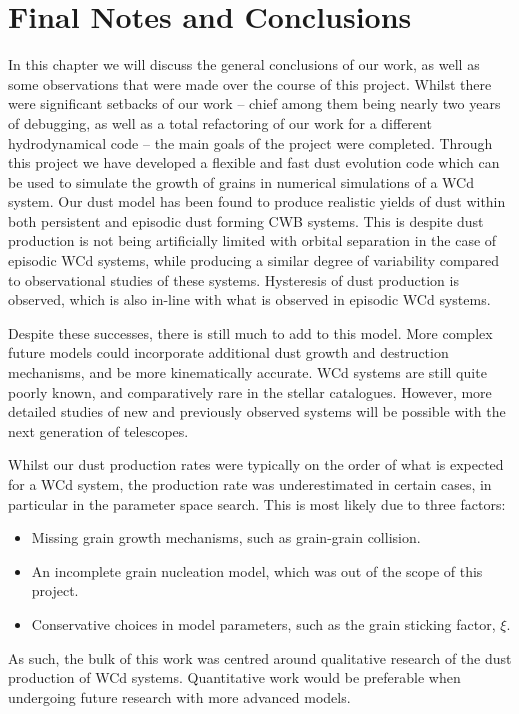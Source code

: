 \chapter{Final Notes and Conclusions}

In this chapter we will discuss the general conclusions of our work, as well as some observations that were made over the course of this project.
Whilst there were significant setbacks of our work -- chief among them being nearly two years of debugging, as well as a total refactoring of our work for a different hydrodynamical code -- the main goals of the project were completed.
Through this project we have developed a flexible and fast dust evolution code which can be used to simulate the growth of grains in numerical simulations of a WCd system.
Our dust model has been found to produce realistic yields of dust within both persistent and episodic dust forming CWB systems.
This is despite dust production is not being artificially limited with orbital separation in the case of episodic WCd systems, while producing a similar degree of variability compared to observational studies of these systems.
Hysteresis of dust production is observed, which is also in-line with what is observed in episodic WCd systems.

Despite these successes, there is still much to add to this model.
More complex future models could incorporate additional dust growth and destruction mechanisms, and be more kinematically accurate.
WCd systems are still quite poorly known, and comparatively rare in the stellar catalogues.
However, more detailed studies of new and previously observed systems will be possible with the next generation of telescopes.

Whilst our dust production rates were typically on the order of what is expected for a WCd system, the production rate was underestimated in certain cases, in particular in the parameter space search.
This is most likely due to three factors:

\begin{itemize}
  \item Missing grain growth mechanisms, such as grain-grain collision.
  \item An incomplete grain nucleation model, which was out of the scope of this project.
  \item Conservative choices in model parameters, such as the grain sticking factor, $\xi$.
\end{itemize}

\noindent
As such, the bulk of this work was centred around qualitative research of the dust production of WCd systems.
Quantitative work would be preferable when undergoing future research with more advanced models.

